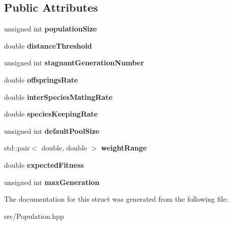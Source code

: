 \subsection*{Public Attributes}
\begin{DoxyCompactItemize}
\item 
\mbox{\label{struct_indie_neat_1_1_population_1_1_settings_a14aafe30a58b2689a13dd1d19500a18f}} 
unsigned int {\bfseries population\+Size}
\item 
\mbox{\label{struct_indie_neat_1_1_population_1_1_settings_ae6c5b61c539cd4e5dc043f798aa65760}} 
double {\bfseries distance\+Threshold}
\item 
\mbox{\label{struct_indie_neat_1_1_population_1_1_settings_a1004cb5c55fde301f09f8bd74cdebc8c}} 
unsigned int {\bfseries stagnant\+Generation\+Number}
\item 
\mbox{\label{struct_indie_neat_1_1_population_1_1_settings_ab524a3e59b527c2a3ed587e2e4a71c0e}} 
double {\bfseries offsprings\+Rate}
\item 
\mbox{\label{struct_indie_neat_1_1_population_1_1_settings_a5cd70811c28d92d8e7ca7abb1478dab4}} 
double {\bfseries inter\+Species\+Mating\+Rate}
\item 
\mbox{\label{struct_indie_neat_1_1_population_1_1_settings_a2718afab60e531784caf63603165d24b}} 
double {\bfseries species\+Keeping\+Rate}
\item 
\mbox{\label{struct_indie_neat_1_1_population_1_1_settings_ac23151beeabfcd56f270b8773aae8eae}} 
unsigned int {\bfseries default\+Pool\+Size}
\item 
\mbox{\label{struct_indie_neat_1_1_population_1_1_settings_a6b5240ac30a735d78ec28547515f0cde}} 
std\+::pair$<$ double, double $>$ {\bfseries weight\+Range}
\item 
\mbox{\label{struct_indie_neat_1_1_population_1_1_settings_a99d7e84d07d5bc1b8c5974558cb7a22d}} 
double {\bfseries expected\+Fitness}
\item 
\mbox{\label{struct_indie_neat_1_1_population_1_1_settings_ad82badf3e35c9aaf91bd12a491a4e528}} 
unsigned int {\bfseries max\+Generation}
\end{DoxyCompactItemize}


The documentation for this struct was generated from the following file\+:\begin{DoxyCompactItemize}
\item 
src/Population.\+hpp\end{DoxyCompactItemize}
